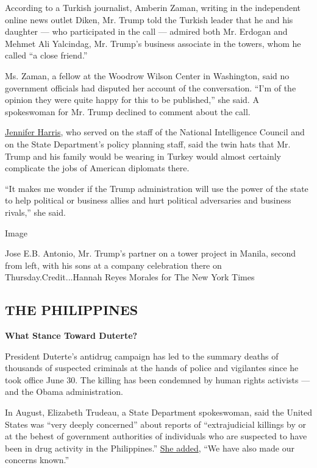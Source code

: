 According to a Turkish journalist, Amberin Zaman, writing in the
independent online news outlet Diken, Mr. Trump told the Turkish leader
that he and his daughter --- who participated in the call --- admired
both Mr. Erdogan and Mehmet Ali Yalcindag, Mr. Trump's business
associate in the towers, whom he called ``a close friend.''

Ms. Zaman, a fellow at the Woodrow Wilson Center in Washington, said no
government officials had disputed her account of the conversation. ``I'm
of the opinion they were quite happy for this to be published,'' she
said. A spokeswoman for Mr. Trump declined to comment about the call.

\href{http://www.cfr.org/experts/china-ukraine-middle-east-and-north-africa/jennifer-m-harris/b18802}{Jennifer
Harris}, who served on the staff of the National Intelligence Council
and on the State Department's policy planning staff, said the twin hats
that Mr. Trump and his family would be wearing in Turkey would almost
certainly complicate the jobs of American diplomats there.

``It makes me wonder if the Trump administration will use the power of
the state to help political or business allies and hurt political
adversaries and business rivals,'' she said.

Image

Jose E.B. Antonio, Mr. Trump's partner on a tower project in Manila,
second from left, with his sons at a company celebration there on
Thursday.Credit...Hannah Reyes Morales for The New York Times

\hypertarget{the-philippines}{%
\subsection{THE PHILIPPINES}\label{the-philippines}}

\textbf{What Stance Toward Duterte?}

President Duterte's antidrug campaign has led to the summary deaths of
thousands of suspected criminals at the hands of police and vigilantes
since he took office June 30. The killing has been condemned by human
rights activists --- and the Obama administration.

In August, Elizabeth Trudeau, a State Department spokeswoman, said the
United States was ``very deeply concerned'' about reports of
``extrajudicial killings by or at the behest of government authorities
of individuals who are suspected to have been in drug activity in the
Philippines.''
\href{http://www.state.gov/r/pa/prs/dpb/2016/08/261275.htm}{She added},
``We have also made our concerns known.''

